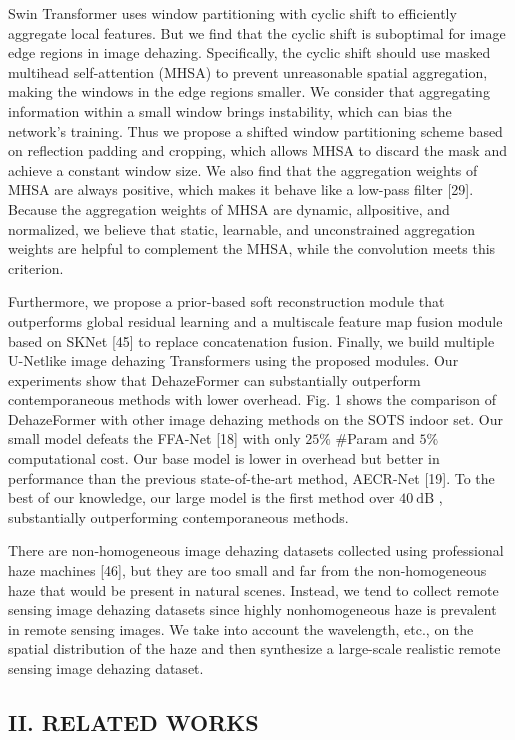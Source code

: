 Swin Transformer uses window partitioning with cyclic shift to efficiently aggregate local features. But we find that the cyclic shift is suboptimal for image edge regions in image dehazing. Specifically, the cyclic shift should use masked multihead self-attention (MHSA) to prevent unreasonable spatial aggregation, making the windows in the edge regions smaller. We consider that aggregating information within a small window brings instability, which can bias the network’s training. Thus we propose a shifted window partitioning scheme based on reflection padding and cropping, which allows MHSA to discard the mask and achieve a constant window size. We also find that the aggregation weights of MHSA are always positive, which makes it behave like a low-pass filter [29]. Because the aggregation weights of MHSA are dynamic, allpositive, and normalized, we believe that static, learnable, and unconstrained aggregation weights are helpful to complement the MHSA, while the convolution meets this criterion.

Furthermore, we propose a prior-based soft reconstruction module that outperforms global residual learning and a multiscale feature map fusion module based on SKNet [45] to replace concatenation fusion. Finally, we build multiple U-Netlike image dehazing Transformers using the proposed modules. Our experiments show that DehazeFormer can substantially outperform contemporaneous methods with lower overhead. Fig. 1 shows the comparison of DehazeFormer with other image dehazing methods on the SOTS indoor set. Our small model defeats the FFA-Net [18] with only $25\%$ \#Param and $5\%$ computational cost. Our base model is lower in overhead but better in performance than the previous state-of-the-art method, AECR-Net [19]. To the best of our knowledge, our large model is the first method over $40\ \mathrm{dB}$ , substantially outperforming contemporaneous methods.

There are non-homogeneous image dehazing datasets collected using professional haze machines [46], but they are too small and far from the non-homogeneous haze that would be present in natural scenes. Instead, we tend to collect remote sensing image dehazing datasets since highly nonhomogeneous haze is prevalent in remote sensing images. We take into account the wavelength, etc., on the spatial distribution of the haze and then synthesize a large-scale realistic remote sensing image dehazing dataset.

\subsection{II. RELATED WORKS}

